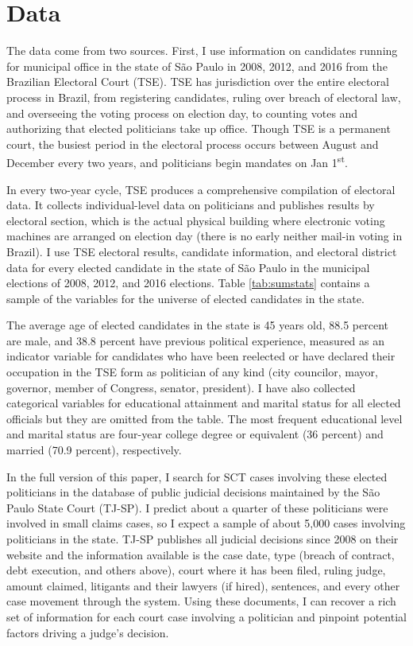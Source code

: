 \documentclass[11pt]{article}
\begin{document}
\section{Data} \label{sec:data_paper2}

The data come from two sources. First, I use information on candidates running for municipal office in the state of São Paulo in 2008, 2012, and 2016 from the Brazilian Electoral Court (TSE). TSE has jurisdiction over the entire electoral process in Brazil, from registering candidates, ruling over breach of electoral law, and overseeing the voting process on election day, to counting votes and authorizing that elected politicians take up office. Though TSE is a permanent court, the busiest period in the electoral process occurs between August and December every two years, and politicians begin mandates on Jan 1\textsuperscript{st}.

In every two-year cycle, TSE produces a comprehensive compilation of electoral data. It collects individual-level data on politicians and publishes results by electoral section, which is the actual physical building where electronic voting machines are arranged on election day (there is no early neither mail-in voting in Brazil). I use TSE electoral results, candidate information, and electoral district data for every elected candidate in the state of São Paulo in the municipal elections of 2008, 2012, and 2016 elections. Table \ref{tab:sumstats} contains a sample of the variables for the universe of elected candidates in the state.



The average age of elected candidates in the state is 45 years old, 88.5 percent are male, and 38.8 percent have previous political experience, measured as an indicator variable for candidates who have been reelected or have declared their occupation in the TSE form as politician of any kind (city councilor, mayor, governor, member of Congress, senator, president). I have also collected categorical variables for educational attainment and marital status for all elected officials but they are omitted from the table. The most frequent educational level and marital status are four-year college degree or equivalent (36 percent) and married (70.9 percent), respectively.

In the full version of this paper, I search for SCT cases involving these elected politicians in the database of public judicial decisions maintained by the São Paulo State Court (TJ-SP). I predict about a quarter of these politicians were involved in small claims cases, so I expect a sample of about 5,000 cases involving politicians in the state. TJ-SP publishes all judicial decisions since 2008 on their website and the information available is the case date, type (breach of contract, debt execution, and others above), court where it has been filed, ruling judge, amount claimed, litigants and their lawyers (if hired), sentences, and every other case movement through the system. Using these documents, I can recover a rich set of information for each court case involving a politician and pinpoint potential factors driving a judge's decision.
\end{document}
